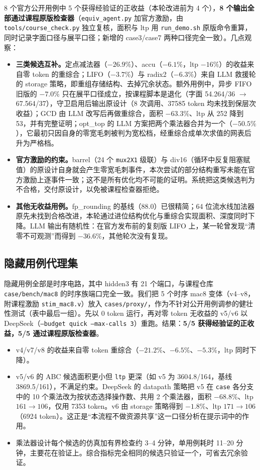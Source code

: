 \documentclass[UTF8,a4paper,zihao=5]{ctexart}
\newcommand{\code}[1]{\texttt{#1}}
\begin{document}
8 个官方公开用例中 5 个获得经验证的正收益（本轮改进前为 4 个），\textbf{8 个输出全部通过课程原版检查器}（\code{equiv\_agent.py} 加官方激励，由 \code{tools/course\_check.py} 独立复核，面积与 ltp 用 \code{run\_demo.sh} 原版命令重算，同时记录字面口径与展平口径；新增的 case3/case7 两种口径完全一致）。几点观察：
\begin{itemize}
\item \textbf{三类候选互补。}定点减法器（$-26.9\%$）、accu（$-6.1\%$，ltp $-16\%$）的收益来自零 token 的重综合；LIFO（$-3.7\%$）与 radix2（$-6.3\%$）来自 LLM 救援轮的 storage 策略，即重组存储结构、去掉冗余状态。额外用例中，异步 FIFO 旧版的 $-7.0\%$ 只在展平口径成立，按课程脚本是退化（字面 54.264/36 $\rightarrow$ 67.564/37），守卫启用后输出原设计（8 次调用、37585 token 均未找到保层次收益）；GCD 由 LLM 改写后再做重综合，面积 $-63.3\%$、ltp 从 252 降到 53，并有完整证明；opt\_top 的 LLM 方案把两个乘法器合并为一个（$-50.5\%$），它最初只因自身的零宽毛刺被判为宽松档，经重综合成单次求值的网表后升为严格档。
\item \textbf{官方激励的约束。}barrel（24 个 \code{mux2X1} 级联）与 div16（循环中反复阻塞赋值）的原设计自身就会产生零宽毛刺事件，本次尝试的部分结构重写未能在官方激励上逐事件一致；这不是所有优化均不可能的证明。系统把这类候选判为不合格，交付原设计，以免被课程检查器拒绝。
\item \textbf{其他无收益用例。}fp\_rounding 的基线（88.0）已很精简；64 位流水线加法器原先未找到合格改进，本轮通过进位结构优化与重综合实现面积、深度同时下降。LLM 输出有随机性：在官方发布前的复刻版 LIFO 上，某一轮曾发现“清零不可观测”而得到 $-36.6\%$，其他轮次没有复现。
\end{itemize}

\subsection{隐藏用例代理集}\label{sec:proxy}
隐藏用例全部是时序电路，其中 hidden3 有 21 个端口，与课程仓库 \code{case/bench/mac8} 的时序族端口完全一致。我们把 5 个时序 mac8 变体（v4--v8，附课程激励 \code{stim\_mac8.v}）放入 \code{cases/proxy/}，作为不针对公开用例调参的健壮性测试（表中最后一组）。先以 0 token 运行，再对零 token 无收益的 v5/v6 以 DeepSeek（\code{--budget quick --max-calls 3}）重跑。结果：\textbf{5/5 获得经验证的正收益，5/5 通过课程原版检查器}。
\begin{itemize}
\item v4/v7/v8 的收益来自零 token 重综合（$-21.2\%$、$-6.5\%$、$-5.3\%$，ltp 同时下降）。
\item v5/v6 的 ABC 候选面积更小但 \code{ltp} 更深（如 v5 为 3604.8/164，基线 3869.5/161），不满足约束。DeepSeek 的 datapath 策略把 v5 在 \code{case} 各分支中的 10 个乘法改为按状态选择操作数、共用 2 个乘法器，面积 $-68.8\%$、ltp $161\rightarrow106$，仅用 7353 token。v6 由 storage 策略得到 $-1.8\%$、ltp $171\rightarrow106$（6924 token）。这正是“本流程不做资源共享”这一口径分析在提示词中的作用。
\item 乘法器设计每个候选的仿真加有界检查约 3--4 分钟，单用例耗时 11--20 分钟，主要花在验证上。综合指标完全相同的候选只验证一个，可省去冗余验证。
\end{itemize}
\end{document}
